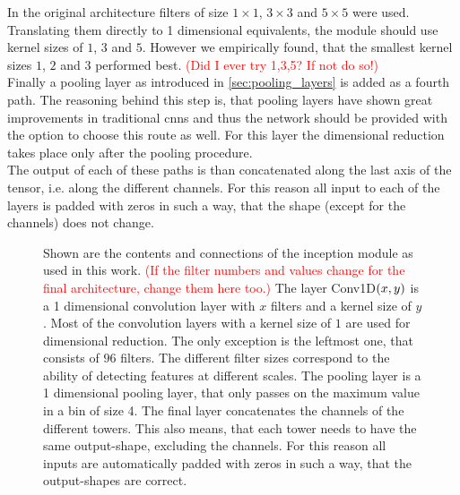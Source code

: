In the original architecture filters of size $1\times1$, $3\times3$ and $5\times5$ were used. Translating them directly to 1 dimensional equivalents, the module should use kernel sizes of $1$, $3$ and $5$. However we empirically found, that the smallest kernel sizes $1$, $2$ and $3$ performed best. \textcolor{red}{(Did I ever try 1,3,5? If not do so!)}\\
Finally a pooling layer as introduced in \autoref{sec:pooling_layers} is added as a fourth path. The reasoning behind this step is, that pooling layers have shown great improvements in traditional \gls{cnns} and thus the network should be provided with the option to choose this route as well. For this layer the dimensional reduction takes place only after the pooling procedure.\\
The output of each of these paths is than concatenated along the last axis of the tensor, i.e. along the different channels. For this reason all input to each of the layers is padded with zeros in such a way, that the shape (except for the channels) does not change.
\begin{figure}
\centering

\caption[Inception module]{Shown are the contents and connections of the inception module as used in this work. \textcolor{red}{(If the filter numbers and values change for the final architecture, change them here too.)} The layer Conv1D${\left( x,y \right)}$ is a 1 dimensional convolution layer with $x$ filters and a kernel size of $y$. Most of the convolution layers with a kernel size of $1$ are used for dimensional reduction. The only exception is the leftmost one, that consists of $96$ filters. The different filter sizes correspond to the ability of detecting features at different scales. The pooling layer is a 1 dimensional pooling layer, that only passes on the maximum value in a bin of size 4. The final layer concatenates the channels of the different towers. This also means, that each tower needs to have the same output-shape, excluding the channels. For this reason all inputs are automatically padded with zeros in such a way, that the output-shapes are correct.}\label{fig:inception_module}
\end{figure}

